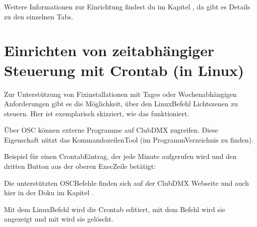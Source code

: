 \documentclass[letterpaper,10pt,ngerman]{sphinxmanual}
\begin{document}
\noindent{}

Weitere Informationen zur Einrichtung findest du im Kapitel
{\hyperref[\detokenize{navigation:navigation-label}]{}}, da gibt es Details zu den einzelnen Tabs.


\section{Einrichten von zeitabhängiger Steuerung mit Crontab (in Linux)}
\label{\detokenize{einrichten:einrichten-von-zeitabhangiger-steuerung-mit-crontab-in-linux}}\label{\detokenize{einrichten:crontab-label}}
Zur Unterstützung von Fixinstallationen mit Tages\sphinxhyphen{} oder
Wochen\sphinxhyphen{}abhängigen Anforderungen gibt es die Möglichkeit, über den
Linux\sphinxhyphen{}Befehl  Lichtszenen zu steuern. Hier ist exemplarisch
skizziert, wie das funktioniert.

Über OSC können externe Programme auf ClubDMX zugreifen. Diese Eigenschaft
nützt das Kommandozeilen\sphinxhyphen{}Tool 
(im Programm\sphinxhyphen{}Verzeichnis zu finden).

Beispiel für einen Crontab\sphinxhyphen{}Eintrag, der jede Minute aufgerufen wird und
den dritten Button aus der oberen Exec\sphinxhyphen{}Zeile betätigt:

\begin{sphinxVerbatim}[commandchars=\\\{\}]
      
\end{sphinxVerbatim}

Die unterstützten OSC\sphinxhyphen{}Befehle finden sich auf der ClubDMX Webseite und auch
hier in der Doku im Kapitel {\hyperref[\detokenize{navigation:navigation-label}]{}}.

Mit dem Linux\sphinxhyphen{}Befehl  wird die Crontab editiert, mit dem
Befehl  wird sie angezeigt und mit  wird sie
gelöscht.
\end{document}
